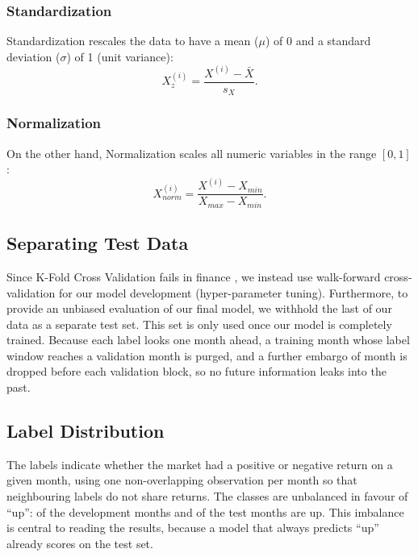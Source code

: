 \documentclass[10pt]{article}
\begin{document}
\subsubsection{Standardization}

Standardization rescales the data to have a mean ($\mu$) of 0 and a standard
deviation ($\sigma$) of 1 (unit variance):
\begin{equation}
  X^{(i)}_z = \frac{X^{(i)} - \bar X}{s_X}.
\end{equation}

\subsubsection{Normalization}

On the other hand, Normalization scales all numeric variables in the range $[0,1]$:
\begin{equation}
  X^{(i)}_{norm} = \frac{X^{(i)} - X_{min}}{X_{max} - X_{min}}.
\end{equation}

\subsection{Separating Test Data}

Since K-Fold Cross Validation fails in finance \cite{deprado}, we instead use
walk-forward cross-validation for our model development (hyper-parameter tuning).
Furthermore, to provide an unbiased evaluation of our final model, we withhold the
last \testFrac{} of our data as a separate test set. This set is only used once our
model is completely trained. Because each label looks one month ahead, a training
month whose label window reaches a validation month is purged, and a further
embargo of \embargo{} month is dropped before each validation block, so no future
information leaks into the past.

\subsection{Label Distribution}

The labels indicate whether the market had a positive or negative return on a given
month, using one non-overlapping observation per month so that neighbouring labels
do not share returns. The classes are unbalanced in favour of ``up'': \devUp{} of
the development months and \testUp{} of the test months are up. This imbalance is
central to reading the results, because a model that always predicts ``up'' already
scores \testUp{} on the test set.
\end{document}
